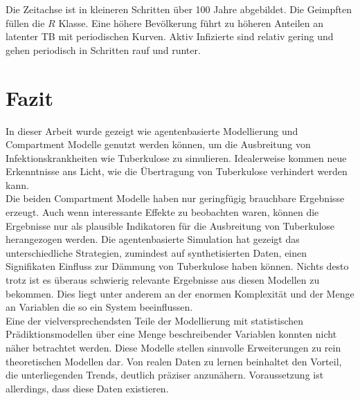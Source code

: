 \documentclass[paper=a4, fontsize=11pt, ngerman, abstract=on]{scrartcl}
\numberwithin{equation}{section} %
\numberwithin{figure}{section} %
\numberwithin{table}{section} %
\begin{document}
Die Zeitachse ist in kleineren Schritten über 100 Jahre abgebildet. Die Geimpften füllen die $R$ Klasse. Eine höhere Bevölkerung führt zu höheren Anteilen an latenter TB mit periodischen Kurven. Aktiv Infizierte sind relativ gering und gehen periodisch in Schritten rauf und runter.

\section{Fazit}

In dieser Arbeit wurde gezeigt wie agentenbasierte Modellierung und Compartment Modelle genutzt werden können, um die Ausbreitung von Infektionskrankheiten wie Tuberkulose zu simulieren. Idealerweise kommen neue Erkenntnisse ans Licht, wie die Übertragung von Tuberkulose verhindert werden kann. \\

Die beiden Compartment Modelle haben nur geringfügig brauchbare Ergebnisse erzeugt. Auch wenn interessante Effekte zu beobachten waren, können die Ergebnisse nur als plausible Indikatoren für die Ausbreitung von Tuberkulose herangezogen werden. Die agentenbasierte Simulation hat gezeigt das unterschiedliche Strategien, zumindest auf synthetisierten Daten, einen Signifikaten Einfluss zur Dämmung von Tuberkulose haben können. Nichts desto trotz ist es überaus schwierig relevante Ergebnisse aus diesen Modellen zu bekommen. Dies liegt unter anderem an der enormen Komplexität und der Menge an Variablen die so ein System beeinflussen. \\

Eine der vielversprechendsten Teile der Modellierung mit statistischen Prädiktionsmodellen über eine Menge beschreibender Variablen konnten nicht näher betrachtet werden. Diese Modelle stellen sinnvolle Erweiterungen zu rein theoretischen Modellen dar. Von realen Daten zu lernen beinhaltet den Vorteil, die unterliegenden Trends, deutlich präziser anzunähern. Voraussetzung ist allerdings, dass diese Daten existieren.

\newpage



\end{document}
